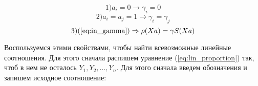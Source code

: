 \documentclass[a4paper,12pt]{report}
\theoremstyle{plain} %
\theoremstyle{definition}
\theoremstyle{remark}
\begin{document}
\begin{large}
 \begin{equation} \label{eq:lin_property1} 1) a_i = 0 \rightarrow \gamma_i = 0 \end{equation}
 \begin{equation} \label{eq:lin_property2} 2) a_i = a_j = 1 \rightarrow \gamma_i = \gamma_j  
 \end{equation}
\begin{equation} \label{eq:lin_property3} 3)(\ref{eq:in_gamma}) \Rightarrow \rho (Xa) = \gamma S(Xa) \end{equation}

Воспользуемся этими свойствами, чтобы найти всевозможные линейные соотношения. Для этого сначала распишем уравнение (\ref{eq:lin_proportion}) так, чтоб в нем не осталось $Y_1, Y_2, ..., Y_n$. Для этого сначала введем обозначения и запишем исходное соотношение:


\end{large}
\end{document}
